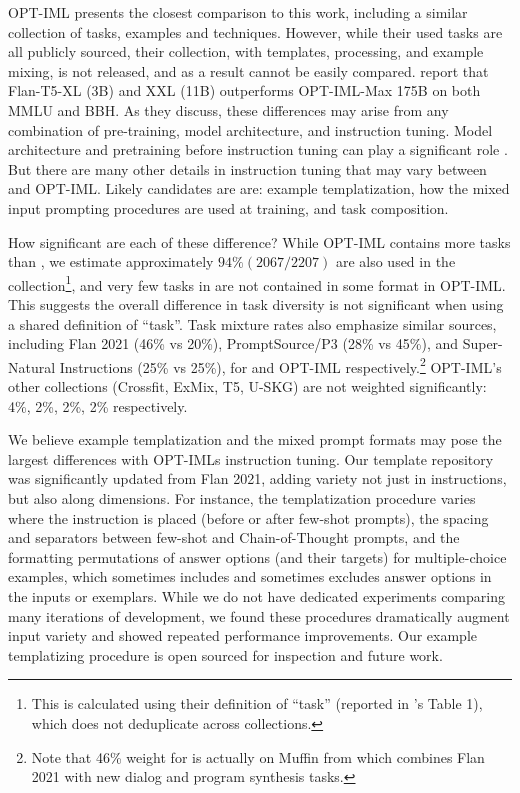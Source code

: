 OPT-IML \citep{iyer2022optiml} presents the closest comparison to this work, including a similar collection of tasks, examples and techniques.
However, while their used tasks are all publicly sourced, their collection, with templates, processing, and example mixing, is not released, and as a result cannot be easily compared.
\citet{iyer2022optiml} report that Flan-T5-XL (3B) and XXL (11B) outperforms OPT-IML-Max 175B on both MMLU and BBH.
As they discuss, these differences may arise from any combination of pre-training, model architecture, and instruction tuning.
Model architecture and pretraining before instruction tuning can play a significant role \citep{wang2022language}.
But there are many other details in instruction tuning that may vary between \flantwo{} and OPT-IML.
Likely candidates are are: example templatization, how the mixed input prompting procedures are used at training, and task composition.

How significant are each of these difference?
While OPT-IML contains more tasks than \flantwo{}, we estimate approximately $94\% (2067 / 2207)$ are also used in the \flantwo{} collection\footnote{This is calculated using their definition of ``task'' (reported in \citet{iyer2022optiml}'s Table 1), which does not deduplicate across collections.}, and very few tasks in \flantwo{} are not contained in some format in OPT-IML.
This suggests the overall difference in task diversity is not significant when using a shared definition of ``task''.
Task mixture rates also emphasize similar sources, including Flan 2021 (46\% vs 20\%), PromptSource/P3 (28\% vs 45\%), and Super-Natural Instructions (25\% vs 25\%), for \flantwo{} and OPT-IML respectively.\footnote{Note that 46\% weight for \flantwo{} is actually on Muffin from \citet{chung2022scaling} which combines Flan 2021 with new dialog and program synthesis tasks.}
OPT-IML's other collections (Crossfit, ExMix, T5, U-SKG) are not weighted significantly: 4\%, 2\%, 2\%, 2\% respectively.

We believe example templatization and the mixed prompt formats may pose the largest differences with OPT-IMLs instruction tuning.
Our template repository was significantly updated from Flan 2021, adding variety not just in instructions, but also along dimensions.
For instance, the templatization procedure varies where the instruction is placed (before or after few-shot prompts), the spacing and separators between few-shot and Chain-of-Thought prompts, and the formatting permutations of answer options (and their targets) for multiple-choice examples, which sometimes includes and sometimes excludes answer options in the inputs or exemplars.
While we do not have dedicated experiments comparing many iterations of development, we found these procedures dramatically augment input variety and showed repeated performance improvements.
Our example templatizing procedure is open sourced for inspection and future work.

